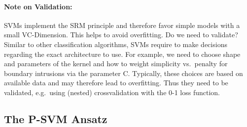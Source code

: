\paragraph{Note on Validation: } SVMs implement the SRM principle and
therefore favor simple models with a small VC-Dimension. This helps to
avoid overfitting. Do we need to validate? Similar to other
classification algorithms, SVMs require to make decisions regarding
the exact architecture to use. For example, we need to choose shape
and parameters of the kernel and how to weight simplicity vs.\ penalty
for boundary intrusions via the parameter C. Typically, these choices
are based on available data and may therefore lead to
overfitting. Thus they need to be validated, e.g.\ using (nested)
crossvalidation with the 0-1 loss function.


\newpage					%
\subsection{The P-SVM Ansatz}


